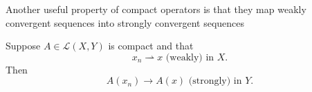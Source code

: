 Another useful property of compact operators is that they map weakly convergent sequences into strongly convergent sequences

\begin{Theorem}
\label{thm:compact-operator-weak-to-strong}
Suppose $A\in\mathcal{L}(X,Y)$ is compact and that
\begin{equation}\label{eq:compact-operator-weak-convergence-hypothesis}
x_n\rightharpoonup x\text{ (weakly) in }X.
\end{equation}
Then
\begin{equation}\label{eq:compact-operator-strong-image-convergence}
A(x_n)\to A(x)\text{ (strongly) in }Y.
\end{equation}

\end{Theorem}

